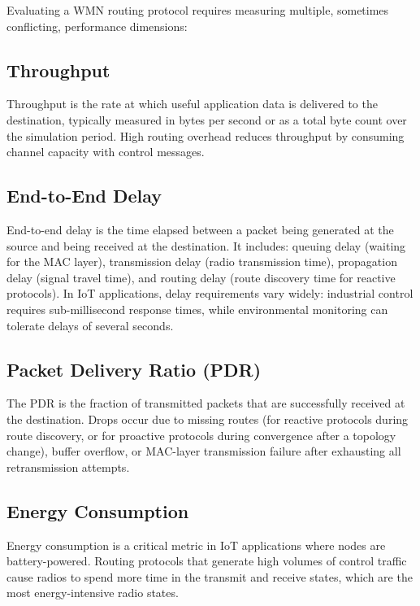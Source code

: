 Evaluating a WMN routing protocol requires measuring multiple, sometimes conflicting,
performance dimensions:

\subsection{Throughput}

Throughput is the rate at which useful application data is delivered to the destination,
typically measured in bytes per second or as a total byte count over the simulation period.
High routing overhead reduces throughput by consuming channel capacity with control messages.

\subsection{End-to-End Delay}

End-to-end delay is the time elapsed between a packet being generated at the source and
being received at the destination. It includes: queuing delay (waiting for the MAC layer),
transmission delay (radio transmission time), propagation delay (signal travel time), and
routing delay (route discovery time for reactive protocols). In IoT applications, delay
requirements vary widely: industrial control requires sub-millisecond response times, while
environmental monitoring can tolerate delays of several seconds.

\subsection{Packet Delivery Ratio (PDR)}

The PDR is the fraction of transmitted packets that are successfully received at the
destination. Drops occur due to missing routes (for reactive protocols during route
discovery, or for proactive protocols during convergence after a topology change), buffer
overflow, or MAC-layer transmission failure after exhausting all retransmission attempts.

\subsection{Energy Consumption}

Energy consumption is a critical metric in IoT applications where nodes are
battery-powered. Routing protocols that generate high volumes of control traffic cause
radios to spend more time in the transmit and receive states, which are the most
energy-intensive radio states.

